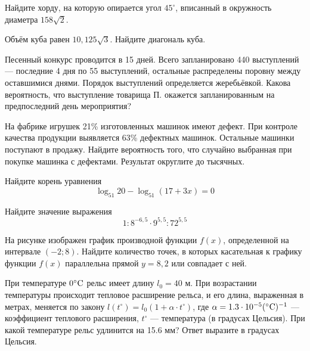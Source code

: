 \def\examvart{Вариант 13.1}

\begin{taskBN}{1}
Найдите хорду, на которую опирается угол $45^\circ$, вписанный в окружность диаметра $158\sqrt{2}$.
\end{taskBN}

\begin{taskBN}{2}
Объём куба равен $10,125\sqrt{3}$. Найдите диагональ куба.
\end{taskBN}

\begin{taskBN}{3}
Песенный конкурс проводится в 15 дней. Всего запланировано 440 выступлений — последние 4 дня по 55 выступлений, остальные распределены поровну между оставшимися днями. Порядок выступлений определяется жеребьёвкой. Какова вероятность, что выступление товарища П. окажется запланированным на предпоследний день мероприятия?
\end{taskBN}

\begin{taskBN}{4}
На фабрике игрушек 21\% изготовленных машинок имеют дефект. При контроле качества продукции выявляется 63\% дефектных машинок. Остальные машинки поступают в продажу. Найдите вероятность того, что случайно выбранная при покупке машинка с дефектами. Результат округлите до тысячных.
\end{taskBN}

\begin{taskBN}{5}
Найдите корень уравнения $$\log_{51}20-\log_{51}(17+3x)=0$$
\end{taskBN}

\begin{taskBN}{6}
Найдите значение выражения $$1:    8^{-6,5}\cdot9^{5,5}:    72^{5,5}$$
\end{taskBN}

\begin{taskBN}{7}
    На рисунке изображен график производной функции $f(x)$, определенной на интервале $(-2; 8)$. Найдите количество точек, в которых касательная к графику функции $f(x)$ параллельна прямой $y=8{,}2$ или совпадает с ней.
\end{taskBN}

\begin{taskBN}{8}
При температуре $0^\circ {\rm{C}}$ рельс имеет длину $l_0=40$ м. При возрастании температуры происходит тепловое расширение рельса, и его длина, выраженная в метрах, меняется по закону $l(t^\circ ) = l_0 (1 + \alpha  \cdot t^\circ)$, где $\alpha=1.3\cdot 10^{-5}(^\circ {\rm{C}})^{-1}$ — коэффициент теплового расширения, $t^\circ$  — температура (в градусах Цельсия). При какой температуре рельс удлинится на 15.6 мм? Ответ выразите в градусах Цельсия.
\end{taskBN}

